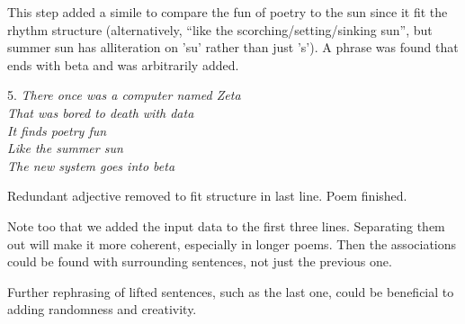 This step added a simile to compare the fun of poetry to the sun since it fit the rhythm structure (alternatively, “like the scorching/setting/sinking sun”, but summer sun has alliteration on 'su' rather than just 's'). A phrase was found that ends with beta and was arbitrarily added.

5.
\textit{There once was a computer named Zeta\\
That was bored to death with data\\
It finds poetry fun\\
Like the summer sun\\
The new system goes into beta}

Redundant adjective removed to fit structure in last line. Poem finished.

Note too that we added the input data to the first three lines. Separating them out will make it more coherent, especially in longer poems. Then the associations could be found with surrounding sentences, not just the previous one.

Further rephrasing of lifted sentences, such as the last one, could be beneficial to adding randomness and creativity.

